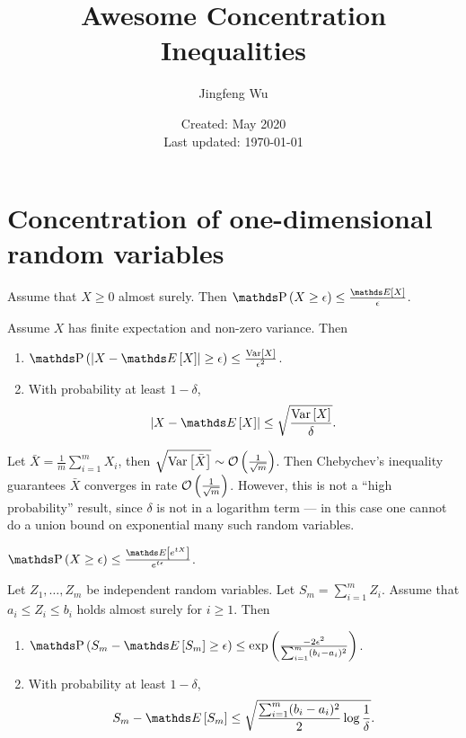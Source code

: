 \documentclass{article}
\title{Awesome Concentration Inequalities}
\author{Jingfeng Wu}
\date{Created: May 2020\\ Last updated: \today}
\begin{document}
\maketitle

\section{Concentration of one-dimensional random variables}
\begin{thm}
Assume that $X\ge 0$ almost surely. Then
$\prob{X\ge \epsilon} \le \frac{\expect{X}}{\epsilon}$.
\end{thm}

\begin{thm}
Assume $X$ has finite expectation and non-zero variance. Then
\begin{enumerate}
\item 
$\prob{\abs{X-\expect{X}} \ge \epsilon} \le \frac{\var{X}}{\epsilon^2}$.
\item With probability at least $1-\delta$,
\begin{equation*}
    \abs{X-\expect{X}} \le \sqrt{\frac{\var{X}}{\delta}}.
\end{equation*}
\end{enumerate}
\end{thm}
\begin{rmk}
Let $\bar{X} = \frac{1}{m}\sum_{i=1}^m X_i$, then $\sqrt{\var{\bar{X}}} \sim \bigO{\frac{1}{\sqrt{m}}}$.
Then Chebychev's inequality guarantees $\bar{X}$ converges in rate $\operatorname{\mathcal{O}}\left(\frac{1}{\sqrt{m}}\right)$. 
However, this is not a ``high probability'' result, since $\delta$ is not in a logarithm term --- in this case one cannot do a union bound on exponential many such random variables.
\end{rmk}

\begin{thm}
$\prob{X \ge \epsilon} \le \frac{\expect{e^{tX}}}{e^{t\epsilon}}$.
\end{thm}

\begin{thm}
Let $Z_1, \dots, Z_m$ be independent random variables. Let $S_m = \sum_{i=1}^m Z_i$.
Assume that 
$a_i\le Z_i \le b_i$
holds almost surely for $i\ge 1$.
Then
\begin{enumerate}
\item 
$\prob{ S_m - \expect{S_m} \ge \epsilon } \le \exp\left(\frac{-2 \epsilon^2}{\sum_{i=1}^m(b_i-a_i)^2}\right)$.
\item
With probability at least $1-\delta$,
\begin{align*}
S_m - \expect{S_m} \le \sqrt{\frac{\sum_{i=1}^m(b_i - a_i)^2}{2}\log\frac{1}{\delta}}. 
\end{align*}
\end{enumerate}
\end{thm}
\end{document}
